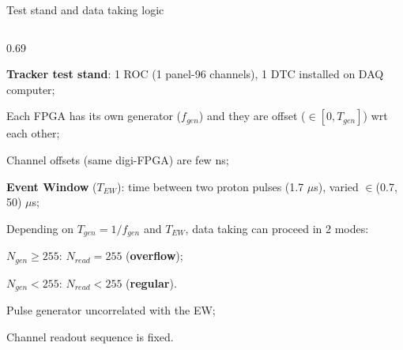 \documentclass{beamer}
\begin{document}
 \begin{frame}{Test stand and data taking logic}
 \vspace{-3.5mm}
\begin{columns}
    \begin{column}{0.69\framewidth}
             \setlength{\leftmargini}{1.3em}
      \begin{itemize}
    {\footnotesize 
          \item \textbf{Tracker test stand}: 1 ROC (1 panel-96 channels), 1 DTC installed on DAQ computer;
            
          \vspace{3mm}
          \item Each FPGA has its own generator ($f_{gen}$) and they are offset ($\in [0 ,T_{gen}]$) wrt each other;
          \vspace{3mm}
          \item Channel offsets (same digi-FPGA) are few ns;
          \vspace{3mm}
          \item \textbf{Event Window} ($T_{EW}$): time between two proton pulses (1.7 $\mu$s), varied $\in$(0.7, 50) $\mu$s;
          \vspace{3mm}
            \item Depending on $T_{gen}=1/f_{gen}$ and $T_{EW}$, data taking can proceed in 2 modes:}
    \vspace{1mm}
\begin{itemize}

    {\footnotesize\item $N_{gen}\geq255$: $N_{read}=255$ (\textbf{overflow});
    \vspace{1mm}
  \item $N_{gen}<255$: $N_{read}<255$ (\textbf{regular}).}
\end{itemize}
{\footnotesize
\vspace{3mm}
\item Pulse generator uncorrelated with the EW;
\vspace{3mm}
\item Channel readout sequence is fixed.

}
\end{itemize}
\end{column}
\end{columns}
\end{frame}
\end{document}
